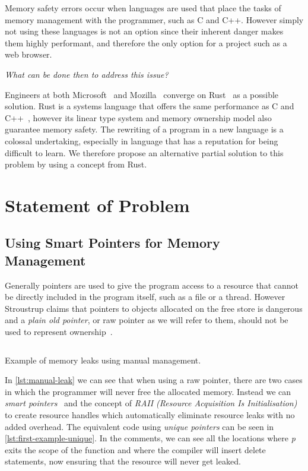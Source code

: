 \documentclass{proposal}
\begin{document}
    Memory safety errors occur when languages are used that place the tasks of memory management with the programmer, such as C and C++.
    However simply not using these languages is not an option since their inherent danger makes them highly performant, and therefore the only option for a project such as a web browser.

    \emph{What can be done then to address this issue?}

    Engineers at both Microsoft~\cite{Thomas2019} and Mozilla~\cite{Hostfelt2019} converge on Rust~\cite{Balasubramanian2017} as a possible solution.
    Rust is a systems language that offers the same performance as C and C++~\cite{Lin2016}, however its linear type system and memory ownership model also guarantee memory safety.
    The rewriting of a program in a new language is a colossal undertaking, especially in language that has a reputation for being difficult to learn.
    We therefore propose an alternative partial solution to this problem by using a concept from Rust.




    \section{Statement of Problem}\label{sec:statement-of-problem}

    \subsection{Using Smart Pointers for Memory Management}\label{subsec:using-smart-pointers-for-memory-management}

    Generally pointers are used to give the program access to a resource that cannot be directly included in the program itself, such as a file or a thread.
    However Stroustrup claims that pointers to objects allocated on the free store is dangerous and a \emph{plain old pointer}, or raw pointer as we will refer to them, should not be used to represent ownership~\cite{Stroustrup2018}.

    \begin{listing}
        \inputminted{c++}{code/manual-leak.cpp}
        \caption{Example of memory leaks using manual management.}
        \label{lst:manual-leak}
    \end{listing}

    In \autoref{lst:manual-leak} we can see that when using a raw pointer, there are two cases in which the programmer will never free the allocated memory.
    Instead we can \emph{smart pointers}~\cite{Dimov2003} and the concept of \emph{RAII (Resource Acquisition Is Initialisation)} to create resource handles which automatically eliminate resource leaks with no added overhead.
    The equivalent code using \emph{unique pointers} can be seen in \autoref{lst:first-example-unique}.
    In the comments, we can see all the locations where \emph{p} exits the scope of the function and where the compiler will insert delete statements, now ensuring that the resource will never get leaked.
\end{document}
